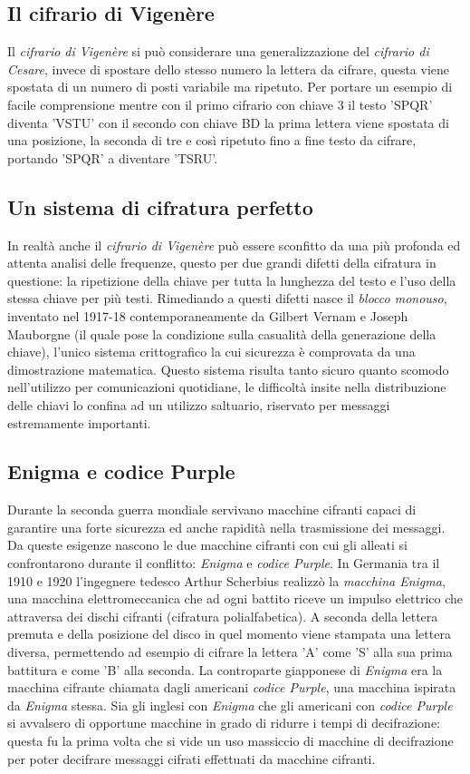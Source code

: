 \documentclass[a4paper, 12pt]{article}
\begin{document}
\subsection{Il cifrario di Vigenère}
Il \textit{cifrario di Vigenère} si può considerare una generalizzazione del \textit{cifrario di Cesare}, invece di spostare dello stesso numero la lettera da cifrare, questa viene spostata di un numero di posti variabile ma ripetuto. Per portare un esempio di facile comprensione mentre con il primo cifrario con chiave 3 il testo 'SPQR' diventa 'VSTU' con il secondo con chiave BD la prima lettera viene spostata di una posizione, la seconda di tre e così ripetuto fino a fine testo da cifrare, portando 'SPQR' a diventare 'TSRU'.
\subsection{Un sistema di cifratura perfetto}
In realtà anche il \textit{cifrario di Vigenère} può essere sconfitto da una più profonda ed attenta analisi delle frequenze, questo per due grandi difetti della cifratura in questione: la ripetizione della chiave per tutta la lunghezza del testo e l'uso della stessa chiave per più testi.\newline
Rimediando a questi difetti nasce il \textit{blocco monouso}, inventato nel 1917-18 contemporaneamente da Gilbert Vernam e Joseph Mauborgne (il quale pose la condizione sulla casualità della generazione della chiave), l'unico sistema crittografico la cui sicurezza è comprovata da una dimostrazione matematica. Questo sistema risulta tanto sicuro quanto scomodo nell'utilizzo per comunicazioni quotidiane, le difficoltà insite nella distribuzione delle chiavi lo confina ad un utilizzo saltuario, riservato per messaggi estremamente importanti.
\subsection{Enigma e codice Purple}
Durante la seconda guerra mondiale servivano macchine cifranti capaci di garantire una forte sicurezza ed anche rapidità nella trasmissione dei messaggi. Da queste esigenze nascono le due macchine cifranti con cui gli alleati si confrontarono durante il conflitto: \textit{Enigma} e \textit{codice Purple}.\newline
In Germania tra il 1910 e 1920 l'ingegnere tedesco Arthur Scherbius realizzò la \textit{macchina Enigma}, una macchina elettromeccanica che ad ogni battito riceve un impulso elettrico che attraversa dei dischi cifranti (cifratura polialfabetica). A seconda della lettera premuta e della posizione del disco in quel momento viene stampata una lettera diversa, permettendo ad esempio di cifrare la lettera 'A' come 'S' alla sua prima battitura e come 'B' alla seconda. La controparte giapponese di \textit{Enigma} era la macchina cifrante chiamata dagli americani \textit{codice Purple}, una macchina ispirata da \textit{Enigma} stessa.\newline
Sia gli inglesi con \textit{Enigma} che gli americani con \textit{codice Purple} si avvalsero di opportune macchine in grado di ridurre i tempi di decifrazione: questa fu la prima volta che si vide un uso massiccio di macchine di decifrazione per poter decifrare messaggi cifrati effettuati da macchine cifranti.
\end{document}
